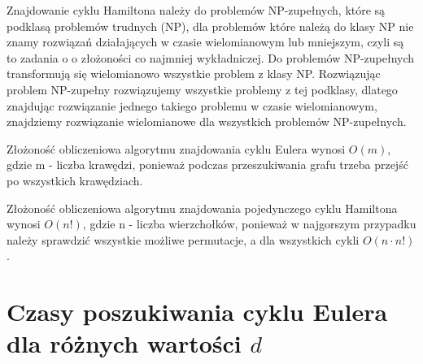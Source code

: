 \documentclass[polish,polish,a4paper]{article}
\begin{document}
\begin{spacing}{1.25}
	Znajdowanie cyklu Hamiltona należy do problemów NP-zupełnych, które są podklasą problemów trudnych (NP), dla problemów które należą do klasy NP nie znamy rozwiązań działających w czasie wielomianowym lub mniejszym, czyli są to zadania o o złożoności co najmniej wykładniczej. Do problemów NP-zupełnych transformują się wielomianowo wszystkie problem z klasy NP. Rozwiązując problem NP-zupełny rozwiązujemy wszystkie problemy z tej podklasy, dlatego znajdując rozwiązanie jednego takiego problemu w czasie wielomianowym, znajdziemy rozwiązanie wielomianowe dla wszystkich problemów NP-zupełnych.
	
	Złożoność obliczeniowa algorytmu znajdowania cyklu Eulera wynosi $O(m)$, gdzie m - liczba krawędzi, ponieważ podczas przeszukiwania grafu trzeba przejść po wszystkich krawędziach.
	
	Złożoność obliczeniowa algorytmu znajdowania pojedynczego cyklu Hamiltona wynosi $O(n!)$, gdzie n - liczba wierzchołków, ponieważ w najgorszym przypadku należy sprawdzić wszystkie możliwe permutacje, a dla wszystkich cykli $O(n \cdot n!)$ .
	

	
\section{Czasy poszukiwania cyklu Eulera dla różnych wartości $d$}


\begin{spacing}{1.3}
	{
		\centering
}
\end{spacing}
\end{spacing}
\end{document}
